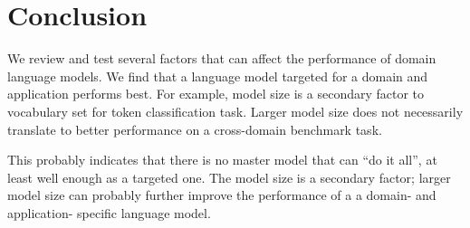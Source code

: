 \documentclass[11pt,a4paper]{article}
\begin{document}
\section{Conclusion}

We review and test several factors that can affect the performance of domain language models.
We find that a language model targeted for a domain and application performs best.
For example, model size is a secondary factor to vocabulary set for token classification task.
Larger model size does not necessarily translate to better performance on a cross-domain benchmark task.

This probably indicates that there is no master model that can ``do it all'', at least well enough as a targeted one.
The model size is a secondary factor; larger model size can probably further improve the performance of a a domain- and application- specific language model.
\end{document}
